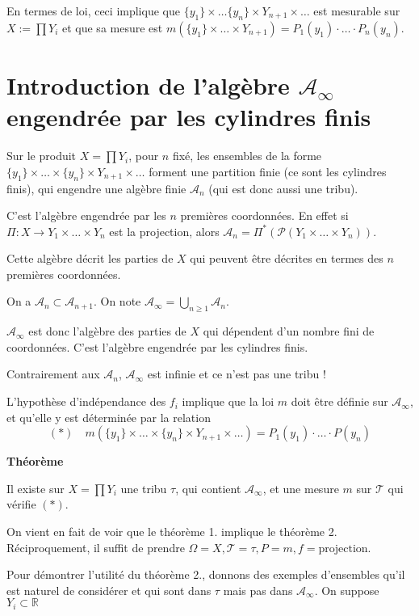 \documentclass[10pt,a4paper,notitlepage ]{report}
\newcommand{\1}{\mathds 1}
\newcounter{th}
\newenvironment{theorem}[1][]{
\refstepcounter{th}
\begin{tcolorbox}
	\textbf{Théorème \theth \ #1}
	
	
}{\end{tcolorbox}}
\begin{document}
En termes de loi, ceci implique que $\{y_1\}\times \dots \{y_n\} \times Y_{n+1} \times \dots$ est mesurable sur $X:=\prod Y_i$ et que sa mesure est $m(\{y_1\}\times \dots \times Y_{n+1}) = P_1(y_1) \cdot \dots \cdot P_n(y_n)$.

\section{Introduction de l'algèbre $\mathcal A_\infty$ engendrée par les cylindres finis}

Sur le produit $X = \prod Y_i$, pour $n$ fixé, les ensembles de la forme $\{y_1\}\times \dots \times \{y_n\}\times Y_{n+1} \times \dots$ forment une partition finie (ce sont les cylindres finis), qui engendre une algèbre finie $\mathcal A_n$ (qui est donc aussi une tribu).

C'est l'algèbre engendrée par les $n$ premières coordonnées. En effet si $\Pi : X \rightarrow Y_1 \times \dots \times Y_n$ est la projection, alors $\mathcal A_n = \Pi^* (\mathcal P(Y_1 \times \dots \times Y_n))$.

Cette algèbre décrit les parties de $X$ qui peuvent être décrites en termes des $n$ premières coordonnées.

On a $\mathcal A_n \subset \mathcal A_{n+1}$. On note $\mathcal A_\infty = \underset{n\ge 1}{\bigcup} \mathcal A_n$.

$\mathcal A_\infty$ est donc l'algèbre des parties de $X$ qui dépendent d'un nombre fini de coordonnées. C'est l'algèbre engendrée par les cylindres finis.

Contrairement aux $\mathcal A_n$, $\mathcal A_\infty$ est infinie et ce n'est pas une tribu !

L'hypothèse d'indépendance des $f_i$ implique que la loi $m$ doit être définie sur $\mathcal A_\infty$, et qu'elle y est déterminée par la relation \[ (*) \quad m(\{y_1\}\times \dots \times \{y_n\} \times Y_{n+1} \times \dots ) = P_1(y_1) \cdot\dots\cdot P(y_n)\]

\begin{theorem}
	Il existe sur $X = \prod Y_i$ une tribu $\tau$, qui contient $\mathcal A_\infty$, et une mesure $m$ sur $\mathcal T$ qui vérifie $(*)$.
\end{theorem}

On vient en fait de voir que le théorème 1. implique le théorème 2.
Réciproquement, il suffit de prendre $\Omega = X, \mathcal T = \tau, P=m, f=\text{projection}$.

Pour démontrer l'utilité du théorème 2., donnons des exemples d'ensembles qu'il est naturel de considérer et qui sont dans $\tau$ mais pas dans $\mathcal A_\infty$. On suppose $Y_i \subset \mathbb R$
\end{document}
